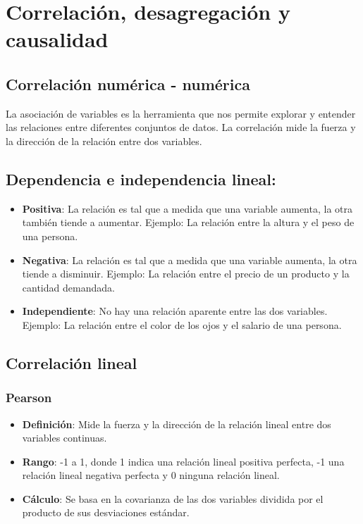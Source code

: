 \documentclass[
  letterpaper,
  DIV=11,
  numbers=noendperiod]{scrreprt}
\providecommand{\tightlist}{%
  \setlength{\itemsep}{0pt}\setlength{\parskip}{0pt}}\usepackage{longtable,booktabs,array}
\begin{document}

\chapter{Correlación, desagregación y
causalidad}\label{correlaciuxf3n-desagregaciuxf3n-y-causalidad}

\section{Correlación numérica -
numérica}\label{correlaciuxf3n-numuxe9rica---numuxe9rica}

La asociación de variables es la herramienta que nos permite explorar y
entender las relaciones entre diferentes conjuntos de datos. La
correlación mide la fuerza y la dirección de la relación entre dos
variables.

\section{Dependencia e independencia
lineal:}\label{dependencia-e-independencia-lineal}

\begin{itemize}
\tightlist
\item
  \textbf{Positiva}: La relación es tal que a medida que una variable
  aumenta, la otra también tiende a aumentar. Ejemplo: La relación entre
  la altura y el peso de una persona.
\item
  \textbf{Negativa}: La relación es tal que a medida que una variable
  aumenta, la otra tiende a disminuir. Ejemplo: La relación entre el
  precio de un producto y la cantidad demandada.
\item
  \textbf{Independiente}: No hay una relación aparente entre las dos
  variables. Ejemplo: La relación entre el color de los ojos y el
  salario de una persona.
\end{itemize}

\section{Correlación lineal}\label{correlaciuxf3n-lineal}

\subsection{Pearson}\label{pearson}

\begin{itemize}
\tightlist
\item
  \textbf{Definición}: Mide la fuerza y la dirección de la relación
  lineal entre dos variables continuas.
\item
  \textbf{Rango}: -1 a 1, donde 1 indica una relación lineal positiva
  perfecta, -1 una relación lineal negativa perfecta y 0 ninguna
  relación lineal.
\item
  \textbf{Cálculo}: Se basa en la covarianza de las dos variables
  dividida por el producto de sus desviaciones estándar.
\end{itemize}
\end{document}
